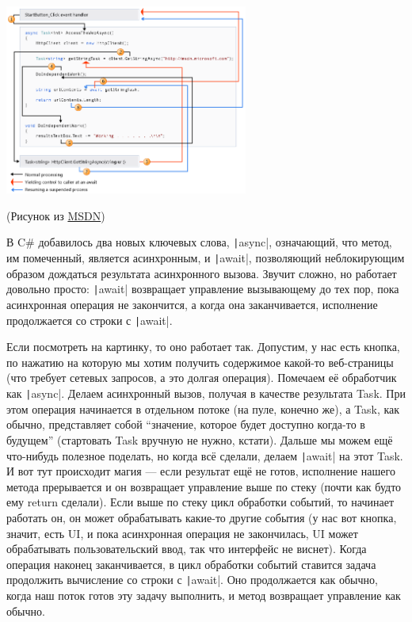 \documentclass[a5paper]{article}
\begin{document}
\begin{center}
    \includegraphics[width=0.6\textwidth]{asyncAwait.png}

    \begin{footnotesize}(Рисунок из \href{https://msdn.microsoft.com/library/hh191443(vs.110).aspx}{MSDN})\end{footnotesize}
\end{center}

В C\# добавилось два новых ключевых слова, \texttt|async|, означающий, что метод, им помеченный, является асинхронным, и \texttt|await|, позволяющий неблокирующим образом дождаться результата асинхронного вызова. Звучит сложно, но работает довольно просто: \texttt|await| возвращает управление вызывающему до тех пор, пока асинхронная операция не закончится, а когда она заканчивается, исполнение продолжается со строки с \texttt|await|. 

Если посмотреть на картинку, то оно работает так. Допустим, у нас есть кнопка, по нажатию на которую мы хотим получить содержимое какой-то веб-страницы (что требует сетевых запросов, а это долгая операция). Помечаем её обработчик как \texttt|async|. Делаем асинхронный вызов, получая в качестве результата Task. При этом операция начинается в отдельном потоке (на пуле, конечно же), а Task, как обычно, представляет собой ``значение, которое будет доступно когда-то в будущем'' (стартовать Task вручную не нужно, кстати). Дальше мы можем ещё что-нибудь полезное поделать, но когда всё сделали, делаем \texttt|await| на этот Task. И вот тут происходит магия --- если результат ещё не готов, исполнение нашего метода прерывается и он возвращает управление выше по стеку (почти как будто ему return сделали). Если выше по стеку цикл обработки событий, то начинает работать он, он может обрабатывать какие-то другие события (у нас вот кнопка, значит, есть UI, и пока асинхронная операция не закончилась, UI может обрабатывать пользовательский ввод, так что интерфейс не виснет). Когда операция наконец заканчивается, в цикл обработки событий ставится задача продолжить вычисление со строки с \texttt|await|. Оно продолжается как обычно, когда наш поток готов эту задачу выполнить, и метод возвращает управление как обычно.
\end{document}
